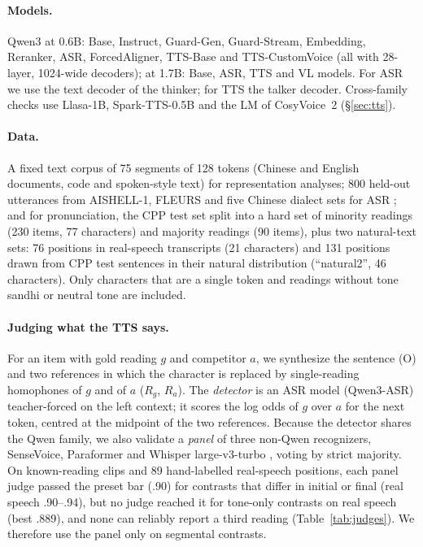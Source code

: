 \documentclass[11pt]{article}
\begin{document}
\paragraph{Models.} Qwen3 at 0.6B: Base, Instruct, Guard-Gen, Guard-Stream, Embedding, Reranker, ASR, Forced\-Aligner, TTS-Base and TTS-Custom\-Voice (all with 28-layer, 1024-wide decoders); at 1.7B: Base, ASR, TTS and VL models. For ASR we use the text decoder of the thinker; for TTS the talker decoder. Cross-family checks use Llasa-1B, Spark-TTS-0.5B and the LM of CosyVoice~2 (\S\ref{sec:tts}).

\paragraph{Data.} A fixed text corpus of 75 segments of 128 tokens (Chinese and English documents, code and spoken-style text) for representation analyses; 800 held-out utterances from AISHELL-1, FLEURS and five Chinese dialect sets for ASR \citep{aishell1,fleurs}; and for pronunciation, the CPP test set \citep{g2pm} split into a hard set of minority readings (230 items, 77 characters) and majority readings (90 items), plus two natural-text sets: 76 positions in real-speech transcripts (21 characters) and 131 positions drawn from CPP test sentences in their natural distribution (``natural2'', 46 characters). Only characters that are a single token and readings without tone sandhi or neutral tone are included.

\paragraph{Judging what the TTS says.} For an item with gold reading $g$ and competitor $a$, we synthesize the sentence (O) and two references in which the character is replaced by single-reading homophones of $g$ and of $a$ ($R_g$, $R_a$). The \emph{detector} is an ASR model (Qwen3-ASR) teacher-forced on the left context; it scores the log odds of $g$ over $a$ for the next token, centred at the midpoint of the two references. Because the detector shares the Qwen family, we also validate a \emph{panel} of three non-Qwen recognizers, SenseVoice, Paraformer and Whisper large-v3-turbo \citep{sensevoice,paraformer,whisper}, voting by strict majority. On known-reading clips and 89 hand-labelled real-speech positions, each panel judge passed the preset bar (.90) for contrasts that differ in initial or final (real speech .90--.94), but no judge reached it for tone-only contrasts on real speech (best .889), and none can reliably report a third reading (Table~\ref{tab:judges}). We therefore use the panel only on segmental contrasts.
\end{document}
